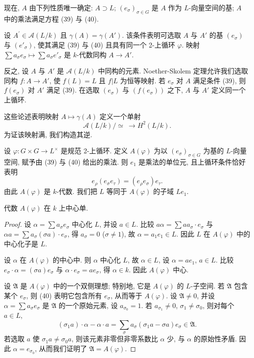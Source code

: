 现在, $A$ 由下列性质唯一确定: $A\supset L$; $(e_\sigma)_{\sigma\in G}$ 是 $A$ 作为 $L$-向量空间的基; $A$ 中的乘法满足方程 (39) 与 (40).

设 $A^{\prime}\in\mathcal{A}(L/k)$ 且 $\gamma(A)=\gamma(A')$. 该条件表明可选取 $A$ 与 $A'$ 的基 $(e_\sigma)$ 与 $(e'_\sigma)$, 使其满足 (39) 与 (40) 且具有同一个 2-上循环 $\varphi$. 映射 $\sum a_\sigma e_\sigma\mapsto\sum a_\sigma e'_\sigma$ 是 $k$-代数同构 $A\to A'$.

反之, 设 $A$ 与 $A'$ 是 $\mathcal{A}(L/k)$ 中同构的元素. Noether-Skolem 定理允许我们选取同构 $f\colon A\to A'$, 使 $f(L)=L$ 且 $f|L$ 为恒等映射. 若 $e_\sigma$ 对 $A$ 满足条件 (39), 则 $f(e_\sigma)$ 对 $A'$ 满足 (39). 在选取 $(e_\sigma)$ 与 $(f(e_\sigma))$ 之下, $A$ 与 $A'$ 定义同一个上循环.

这些论述表明映射 $A\mapsto\gamma(A)$ 定义一个单射
\[
\mathcal{A}(L/k)/\simeq\ \to H^{2}(L/k).
\]
为证该映射满, 我们构造其逆.

设 $\varphi\colon G\times G\to L^{\times}$ 是规范 2-上循环. 定义 $A(\varphi)$ 为以 $(e_\sigma)_{\sigma\in G}$ 为基的 $L$-向量空间, 赋予由 (39) 与 (40) 给出的乘法. 则 $e_1$ 是乘法的单位元, 且上循环条件恰好表明
\[
e_{\rho}(e_{\sigma}e_{\tau})=(e_{\rho}e_{\sigma})e_{\tau}.
\]
由此 $A(\varphi)$ 是 $k$-代数. 我们把 $L$ 等同于 $A(\varphi)$ 的子域 $Le_1$.

\begin{lemma}\label{lem:iv.3.13}
代数 $A(\varphi)$ 在 $k$ 上中心单.
\end{lemma}

\begin{proof}
设 $\alpha=\sum a_\sigma e_\sigma$ 中心化 $L$, 并设 $a\in L$. 比较 $a\alpha=\sum aa_\sigma\cdot e_\sigma$ 与 $\alpha a=\sum a_\sigma(\sigma a)\cdot e_\sigma$, 得 $a_\sigma=0$ ($\sigma\neq 1$), 故 $\alpha=a_1e_1\in L$. 因此 $L$ 在 $A(\varphi)$ 中的中心化子是 $L$.

设 $\alpha$ 在 $A(\varphi)$ 的中心中. 则 $\alpha$ 中心化 $L$, 故 $\alpha\in L$, 设 $\alpha=ae_1$, $a\in L$. 比较 $e_\sigma\cdot\alpha=(\sigma a)e_\sigma$ 与 $\alpha\cdot e_\sigma=ae_\sigma$, 得 $\alpha\in k$. 因此 $A(\varphi)$ 中心.

设 $\mathfrak{A}$ 是 $A(\varphi)$ 中的一个双侧理想; 特别地, 它是 $A(\varphi)$ 的 $L$-子空间. 若 $\mathfrak{A}$ 包含某个 $e_\sigma$, 则 (40) 表明它包含所有 $e_\sigma$, 从而等于 $A(\varphi)$. 设 $\mathfrak{A}\neq 0$, 并设 $\alpha=\sum a_\sigma e_\sigma$ 是 $\mathfrak{A}$ 的一个原始元素, 设 $a_{\sigma_0}=1$. 若 $a_{\sigma_1}\neq 0$, $\sigma_1\neq\sigma_0$, 则对每个 $a\in L$,
\[
(\sigma_{1}a)\cdot\alpha-\alpha\cdot a=\sum_{\sigma}a_{\sigma}(\sigma_{1}a-\sigma a)e_{\sigma}\in\mathfrak{A}.
\]
若选取 $a$ 使 $\sigma_1 a\neq\sigma_0 a$, 则该元素非零但非零系数比 $\alpha$ 少, 与 $\alpha$ 的原始性矛盾. 因此 $\alpha=e_{\sigma_0}$, 从而我们证明了 $\mathfrak{A}=A(\varphi)$.
\end{proof}

